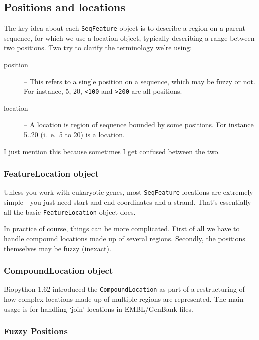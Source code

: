 \subsection{Positions and locations}
\label{sec:locations}

The key idea about each \verb|SeqFeature| object is to describe a
region on a parent sequence, for which we use a location object,
typically describing a range between two positions. Two try to
clarify the terminology we're using:

\begin{description}
  \item[position] -- This refers to a single position on a sequence,
  which may be fuzzy or not. For instance, 5, 20, \verb|<100| and
  \verb|>200| are all positions.

  \item[location] -- A location is region of sequence bounded by
  some positions. For instance 5..20 (i.~e.~5 to 20) is a location.
\end{description}

I just mention this because sometimes I get confused between the two.

\subsubsection{FeatureLocation object}

Unless you work with eukaryotic genes, most \verb|SeqFeature| locations are
extremely simple - you just need start and end coordinates and a strand.
That's essentially all the basic \verb|FeatureLocation| object does.


In practice of course, things can be more complicated. First of all
we have to handle compound locations made up of several regions.
Secondly, the positions themselves may be fuzzy (inexact).

\subsubsection{CompoundLocation object}

Biopython 1.62 introduced the \verb|CompoundLocation| as part of
a restructuring of how complex locations made up of multiple regions
are represented.
The main usage is for handling `join' locations in EMBL/GenBank files.


\subsubsection{Fuzzy Positions}

